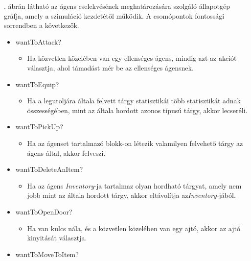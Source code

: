 . ábrán látható az ágens cselekvésének meghatározására szolgáló állapotgép gráfja, amely a szimuláció kezdetétől működik.
A csomópontok fontossági sorrendben a következők.
\begin{itemize}
    \item wantToAttack?
    
    \begin{itemize}
        \item Ha közvetlen közelében van egy ellenséges ágens, mindig azt az akciót választja, ahol támadást mér be az ellenséges ágensnek.
    \end{itemize}

    \item wantToEquip?
    
    \begin{itemize}
        \item Ha a legutoljára általa felvett tárgy statisztikái több statisztikát adnak összességében, mint az általa hordott azonos típusú tárgy, akkor lecseréli.
    \end{itemize}

    \item wantToPickUp?
    
    \begin{itemize}
        \item Ha az ágenset tartalmazó blokk-on létezik valamilyen felvehető tárgy az ágens által, akkor felveszi.
    \end{itemize}

    \item wantToDeleteAnItem?
    
    \begin{itemize}
        \item Ha az ágens \textit{Inventory}-ja tartalmaz olyan hordható tárgyat, amely nem jobb mint az általa hordott tárgy, akkor eltávolítja az\textit{Inventory}-jából.
    \end{itemize}

    \item wantToOpenDoor?
    
    \begin{itemize}
        \item Ha van kulcs nála, és a közvetlen közelében van egy ajtó, akkor az ajtó kinyitását választja.
    \end{itemize}

    \item wantToMoveToItem?
    

\end{itemize}
